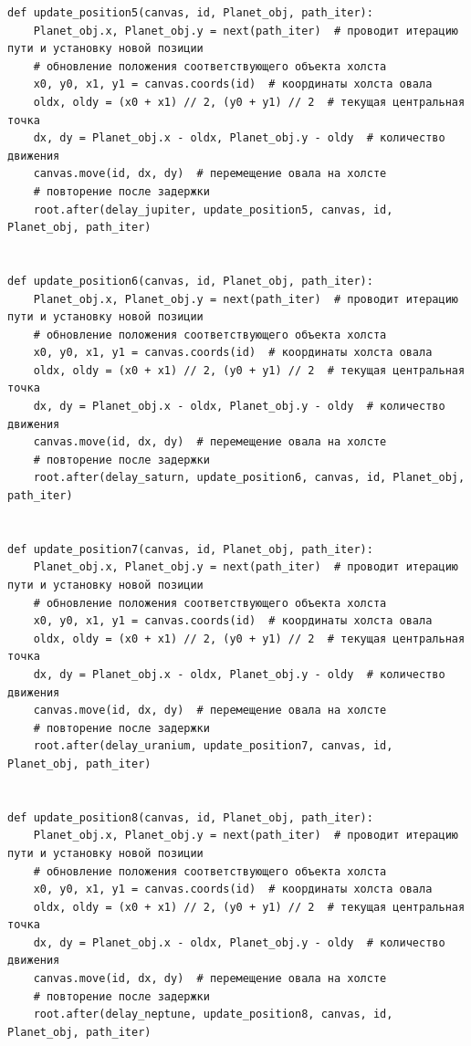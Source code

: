 \documentclass[11pt,a4paper]{report}
\begin{document}
\begin{verbatim}
def update_position5(canvas, id, Planet_obj, path_iter):
    Planet_obj.x, Planet_obj.y = next(path_iter)  # проводит итерацию пути и установку новой позиции
    # обновление положения соответствующего объекта холста
    x0, y0, x1, y1 = canvas.coords(id)  # координаты холста овала
    oldx, oldy = (x0 + x1) // 2, (y0 + y1) // 2  # текущая центральная точка
    dx, dy = Planet_obj.x - oldx, Planet_obj.y - oldy  # количество движения
    canvas.move(id, dx, dy)  # перемещение овала на холсте
    # повторение после задержки
    root.after(delay_jupiter, update_position5, canvas, id, Planet_obj, path_iter)


def update_position6(canvas, id, Planet_obj, path_iter):
    Planet_obj.x, Planet_obj.y = next(path_iter)  # проводит итерацию пути и установку новой позиции
    # обновление положения соответствующего объекта холста
    x0, y0, x1, y1 = canvas.coords(id)  # координаты холста овала
    oldx, oldy = (x0 + x1) // 2, (y0 + y1) // 2  # текущая центральная точка
    dx, dy = Planet_obj.x - oldx, Planet_obj.y - oldy  # количество движения
    canvas.move(id, dx, dy)  # перемещение овала на холсте
    # повторение после задержки
    root.after(delay_saturn, update_position6, canvas, id, Planet_obj, path_iter)


def update_position7(canvas, id, Planet_obj, path_iter):
    Planet_obj.x, Planet_obj.y = next(path_iter)  # проводит итерацию пути и установку новой позиции
    # обновление положения соответствующего объекта холста
    x0, y0, x1, y1 = canvas.coords(id)  # координаты холста овала
    oldx, oldy = (x0 + x1) // 2, (y0 + y1) // 2  # текущая центральная точка
    dx, dy = Planet_obj.x - oldx, Planet_obj.y - oldy  # количество движения
    canvas.move(id, dx, dy)  # перемещение овала на холсте
    # повторение после задержки
    root.after(delay_uranium, update_position7, canvas, id, Planet_obj, path_iter)


def update_position8(canvas, id, Planet_obj, path_iter):
    Planet_obj.x, Planet_obj.y = next(path_iter)  # проводит итерацию пути и установку новой позиции
    # обновление положения соответствующего объекта холста
    x0, y0, x1, y1 = canvas.coords(id)  # координаты холста овала
    oldx, oldy = (x0 + x1) // 2, (y0 + y1) // 2  # текущая центральная точка
    dx, dy = Planet_obj.x - oldx, Planet_obj.y - oldy  # количество движения
    canvas.move(id, dx, dy)  # перемещение овала на холсте
    # повторение после задержки
    root.after(delay_neptune, update_position8, canvas, id, Planet_obj, path_iter)



\end{verbatim}
\end{document}
